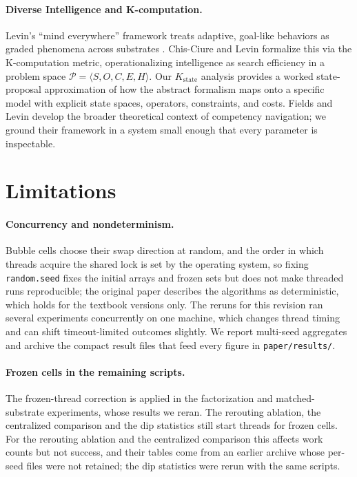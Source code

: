 \documentclass[11pt]{article}
\begin{document}
\paragraph{Diverse Intelligence and K-computation.}
Levin's ``mind everywhere'' framework treats adaptive, goal-like behaviors as graded phenomena
across substrates \cite{levin2022technological}. Chis-Ciure and Levin \cite{chisciure2025cognition}
formalize this via the K-computation metric, operationalizing intelligence as search efficiency
in a problem space $\mathcal{P} = \langle S, O, C, E, H \rangle$. Our
$K_{\mathrm{state}}$ analysis provides a worked state-proposal approximation of how the abstract
formalism maps onto a specific model with explicit state spaces, operators, constraints, and costs.
Fields and Levin
\cite{fields2022competency} develop the broader theoretical context of competency navigation; we
ground their framework in a system small enough that every parameter is inspectable.

\section{Limitations}
\label{sec:limits}
\paragraph{Concurrency and nondeterminism.}
Bubble cells choose their swap direction at random, and the order in which threads acquire the
shared lock is set by the operating system, so fixing \texttt{random.seed} fixes the initial
arrays and frozen sets but does not make threaded runs reproducible; the original paper describes
the algorithms as deterministic, which holds for the textbook versions only. The reruns for this
revision ran several experiments concurrently on one machine, which changes thread timing and can
shift timeout-limited outcomes slightly. We report multi-seed aggregates and archive the compact
result files that feed every figure in \texttt{paper/results/}.

\paragraph{Frozen cells in the remaining scripts.}
The frozen-thread correction is applied in the factorization and matched-substrate experiments,
whose results we reran. The rerouting ablation, the centralized comparison and the dip statistics
still start threads for frozen cells. For the rerouting ablation and the centralized comparison
this affects work counts but not success, and their tables come from an earlier archive whose
per-seed files were not retained; the dip statistics were rerun with the same scripts.
\end{document}
